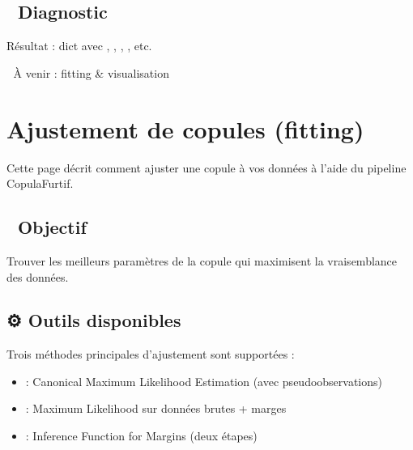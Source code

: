 \documentclass[letterpaper,18pt,english]{sphinxhowto}
\begin{document}
\subsection{🔬 Diagnostic}
\label{\detokenize{pages/usage:diagnostic}}
\begin{sphinxVerbatim}[commandchars=\\\{\}]
 

  
   
\end{sphinxVerbatim}

\sphinxAtStartPar
Résultat : dict avec , , , , etc.

\sphinxAtStartPar
📌 À venir : fitting \& visualisation

\sphinxstepscope


\section{Ajustement de copules (fitting)}
\label{\detokenize{pages/fitting:ajustement-de-copules-fitting}}\label{\detokenize{pages/fitting:fitting}}\label{\detokenize{pages/fitting::doc}}
\sphinxAtStartPar
Cette page décrit comment ajuster une copule à vos données à l’aide du pipeline CopulaFurtif.


\subsection{🧪 Objectif}
\label{\detokenize{pages/fitting:objectif}}
\sphinxAtStartPar
Trouver les meilleurs paramètres de la copule qui maximisent la vraisemblance des données.


\subsection{⚙️ Outils disponibles}
\label{\detokenize{pages/fitting:outils-disponibles}}
\sphinxAtStartPar
Trois méthodes principales d’ajustement sont supportées :
\begin{itemize}
\item {} 
\sphinxAtStartPar
{} : Canonical Maximum Likelihood Estimation (avec pseudo\sphinxhyphen{}observations)

\item {} 
\sphinxAtStartPar
{}  : Maximum Likelihood sur données brutes + marges

\item {} 
\sphinxAtStartPar
{}  : Inference Function for Margins (deux étapes)

\end{itemize}
\end{document}
